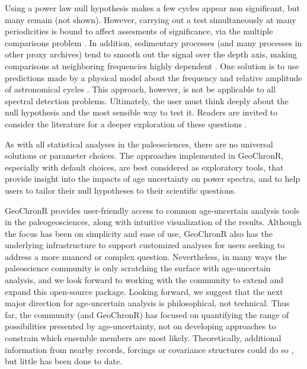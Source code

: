 \documentclass[gchron, manuscript]{copernicus}
\begin{document}
Using a power law null hypothesis makes a few cycles appear non significant, but many remain (not shown).
However, carrying out a test simultaneously at many periodicities is bound to affect assesments of significance, via the multiple comparisons problem \citep{Vaughan_PP2011}.
In addition, sedimentary processes (and many processes in other proxy archives) tend to smooth out the signal over the depth axis, making comparisons at neighboring frequencies highly dependent \citep{Meyers_2012}.
One solution is to use predictions made by a physical model about the frequency and relative amplitude of astronomical cycles \citep{MeyersSageman_2007}.
This approach, however, is not be applicable to all spectral detection problems.
Ultimately, the user must think deeply about the null hypothesis and the most sensible way to test it.
Readers are invited to consider the literature for a deeper exploration of these questions \citep[e.g.,][]{Vaughan_PP2011, Meyers_2012, Meyers_2015, MeyersMalinverno2018}.

As with all statistical analyses in the paleosciences, there are no universal solutions or parameter choices.
The approaches implemented in GeoChronR, especially with default choices, are best considered as exploratory tools, that provide insight into the impacts of age uncertainty on power spectra, and to help users to tailor their null hypotheses to their scientific questions.

\conclusions

GeoChronR provides user-friendly access to common age-uncertain analysis tools in the paleogeosciences, along with intuitive visualization of the results.
Although the focus has been on simplicity and ease of use, GeoChronR also has the underlying infrastructure to support customized analyses for users seeking to address a more nuanced or complex question.
Nevertheless, in many ways the paleoscience community is only scratching the surface with age-uncertain analysis, and we look forward to working with the community to extend and expand this open-source package.
Looking forward, we suggest that the next major direction for age-uncertain analysis is philosophical, not technical.
Thus far, the community (and GeoChronR) has focused on quantifying the range of possibilities presented by age-uncertainty, not on developing approaches to constrain which ensemble members are most likely.
Theoretically, additional information from nearby records, forcings or covariance structures could do so \citep{wernerTingley2015}, but little has been done to date.
\end{document}
